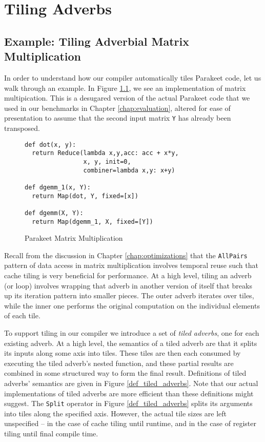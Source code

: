 \chapter{Tiling Adverbs\label{chap:tiling_adverbs}}

\section{Example: Tiling Adverbial Matrix Multiplication\label{sec:adverb_mm}}

In order to understand how our compiler automatically tiles Parakeet code, let us walk through an example.  In Figure \ref{parmm}, we see an implementation of matrix multipication.  This is a desugared version of the actual Parakeet code that we used in our benchmarks in Chapter \ref{chap:evaluation}, altered for ease of presentation to assume that the second input matrix \lstinline{Y} has already been transposed.

\begin{figure}
\begin{singlespace}
\begin{lstlisting}
def dot(x, y):
  return Reduce(lambda x,y,acc: acc + x*y,
                x, y, init=0,
                combiner=lambda x,y: x+y)

def dgemm_1(x, Y):
  return Map(dot, Y, fixed=[x])
                
def dgemm(X, Y):
  return Map(dgemm_1, X, fixed=[Y])
\end{lstlisting}
\end{singlespace}
\label{parmm}
\caption{Parakeet Matrix Multiplication}
\end{figure}

Recall from the discussion in Chapter \ref{chap:optimizations} that the \lstinline{AllPairs} pattern of data access in matrix multiplication involves temporal reuse such that cache tiling is very beneficial for performance.  At a high level, tiling an adverb (or loop) involves wrapping that adverb in another version of itself that breaks up its iteration pattern into smaller pieces.  The outer adverb iterates over tiles, while the inner one performs the original computation on the individual elements of each tile.

To support tiling in our compiler we introduce a set of \emph{tiled adverbs}, one for each existing adverb.  At a high level, the semantics of a tiled adverb are that it splits its inputs along some axis into tiles.  These tiles are then each consumed by executing the tiled adverb's nested function, and these partial results are combined in some structured way to form the final result.  Definitions of tiled adverbs' semantics are given in Figure \ref{def_tiled_adverbs}.  Note that our actual implementations of tiled adverbs are more efficient than these definitions might suggest.  The \lstinline{Split} operator in Figure \ref{def_tiled_adverbs} splits its arguments into tiles along the specified axis.  However, the actual tile sizes are left unspecified -- in the case of cache tiling until runtime, and in the case of register tiling until final compile time.

